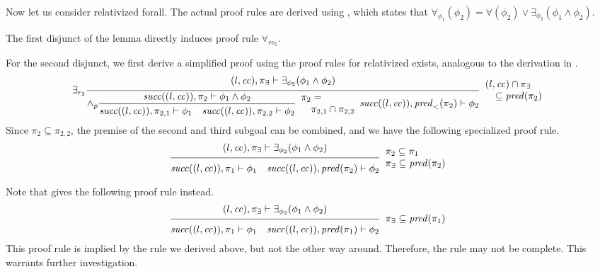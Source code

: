 \documentclass{article}
\newcommand{\proofrule}[3][]{#1 \frac{\raisebox{.7ex}{\normalsize{$#2$}}}
  {\raisebox{-1.0ex}{\normalsize{$#3$}}}}
\newcommand{\placeholder}[1][]{\pi_{#1}}
\newcommand{\loc}{l}
\newcommand{\region}{\mathit{cc}}
\newcommand{\suc}{\mathit{succ}}
\newcommand{\pre}{\mathit{pred}}
\begin{document}
Now let us consider relativized forall. The actual proof rules are derived using \cite[Lemma 1]{FC:14}, which states that $\forall_{\phi_1}(\phi_2) = \forall(\phi_2) \lor \exists_{\phi_2}(\phi_1 \land \phi_2)$.

The first disjunct of the lemma directly induces proof rule $\forall_{ro_1}$.

For the second disjunct, we first derive a simplified proof using the proof rules for relativized
exists, analogous to the
derivation in \cite[Appendix C.1]{FC:14report}.
\[
\proofrule[\exists_{r_2}]
{(\loc, \region), \placeholder[\exists] \vdash \exists_{\phi_2}(\phi_1 \land \phi_2)}
{ {\proofrule[\land_p]
  {\suc((\loc, \region)), \placeholder[2] \vdash \phi_1 \land \phi_2}
  {\suc((\loc, \region)), \placeholder[2,1] \vdash \phi_1
    \quad \suc((\loc, \region)), \placeholder[2,2] \vdash \phi_2}
  \begin{array}{l}
  \placeholder[2] = \\
  \quad \placeholder[2,1] \cap \placeholder[2,2]
  \end{array}
  }
 \suc((\loc, \region)), \pre_{<}(\placeholder[2]) \vdash \phi_2
 }
\begin{array}{l}
(\loc, \region) \cap \placeholder[\exists] \\
\quad \subseteq \pre(\placeholder[2])
\end{array}
\]
Since $\placeholder[2] \subseteq \placeholder[2,2]$, the premise of the second and third subgoal
can be combined, and we have the following specialized proof rule.
\[
\proofrule
{(\loc, \region), \placeholder[\exists] \vdash \exists_{\phi_2}(\phi_1 \land \phi_2)}
{ \suc((\loc, \region)), \placeholder[1] \vdash \phi_1
\quad \suc((\loc, \region)), \pre(\placeholder[2]) \vdash \phi_2
 }
\begin{array}{l}
\placeholder[2] \subseteq \placeholder[1]\\
\placeholder[\exists] \subseteq \pre(\placeholder[2])
\end{array}
\]

{\color{red}
Note that \cite[Appendix C.1]{FC:14report} gives the following proof rule instead.
\[
\proofrule
{(\loc, \region), \placeholder[\exists] \vdash \exists_{\phi_2}(\phi_1 \land \phi_2)}
{ \suc((\loc, \region)), \placeholder[1] \vdash \phi_1
\quad \suc((\loc, \region)), \pre(\placeholder[1]) \vdash \phi_2
 }
\begin{array}{l}
\placeholder[\exists] \subseteq \pre(\placeholder[1])
\end{array}
\]
This proof rule is implied by the rule we derived above, but not the other way around. Therefore, the rule may not be complete. This warrants further investigation.
}
\end{document}
